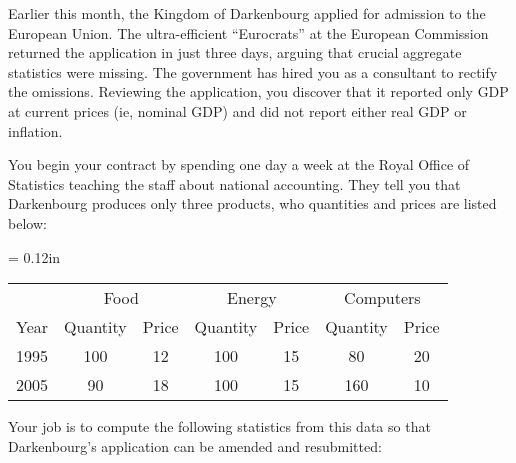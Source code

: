 \documentclass[12pt]{exam}
\begin{document}
\begin{questions}

Earlier this month, the
Kingdom of Darkenbourg applied for admission to the European
Union. The ultra-efficient ``Eurocrats'' at the European Commission
returned the application in just three days, arguing that crucial
aggregate statistics were missing. The government has hired you as
a consultant to rectify the omissions. Reviewing the application,
you discover that it reported only GDP at current prices (ie,
nominal GDP) and did not report either real GDP or inflation.

You begin your contract by spending one day a week at the Royal
Office of Statistics teaching the staff about national accounting.
They tell you that Darkenbourg produces only three products, 
who quantities and prices are listed below:  
\begin{center}
\tabcolsep = 0.12in
\begin{tabular}{lcccccc}
\hline\hline%
     &\multicolumn{2}{c}{Food}
     &\multicolumn{2}{c}{Energy} 
     &\multicolumn{2}{c}{Computers}\\%
\cline{2-7}%
Year &   Quantity & Price   & Quantity &    Price   &  Quantity & Price    \\
\hline\hline%
1995 &     100    & 12 & 100 & 15 & 80  & 20  \\%
2005 &     90    & 18 & 100 & 15 & 160 & 10 \\%
\hline\hline%
\end{tabular}
\end{center}
Your job is to compute the following statistics from this data so
that Darkenbourg's application can be amended and resubmitted:
%
\end{questions}
\end{document}
